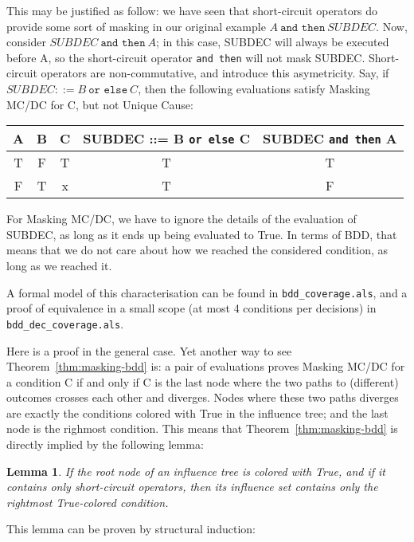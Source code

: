 \documentclass[a4paper,12pt,twoside]{article}
\newcommand{\andthen}{\texttt{and then}}
\newcommand{\orelse}{\texttt{or else}}
\newcommand{\alloyspec}[1]{\texttt{#1}}
\newtheorem{lemma}{Lemma}[subsection]
\begin{document}
This may be justified as follow: we have seen that short-circuit operators
do provide some sort of masking in our original example
$A \ \andthen{} \ SUBDEC$. Now, consider $SUBDEC \ \andthen{} \ A$; in this
case, SUBDEC will always be executed before A, so the short-circuit operator
\andthen{} will not mask SUBDEC. Short-circuit operators are non-commutative,
and introduce this asymetricity. Say, if $SUBDEC ::= B \ \orelse \ C$, then
the following evaluations satisfy Masking MC/DC for C, but not Unique Cause:

\begin{center}
\begin{tabular}{|c|c|c||c||c|}
\hline
A & B & C & SUBDEC ::= B \orelse{} C & SUBDEC \andthen{} A \\ \hline
T & F & T & T                        & T \\ \hline
F & T & x & T                        & F \\ \hline
\end{tabular}
\end{center}

For Masking MC/DC, we have to ignore the details of the evaluation of SUBDEC,
as long as it ends up being evaluated to True. In terms of BDD, that means
that we do not care about how we reached the considered condition, as long
as we reached it.

A formal model of this characterisation can be found in
\alloyspec{bdd\_coverage.als}, and a proof of equivalence in a small scope
(at most 4 conditions per decisions) in \alloyspec{bdd\_dec\_coverage.als}.

Here is a proof in the general case. Yet another way to see
Theorem~\ref{thm:masking-bdd} is: a pair of evaluations proves Masking
MC/DC for a condition C if and only if C is the last node where the
two paths to (different) outcomes crosses each other and
diverges. Nodes where these two paths diverges are exactly the
conditions colored with True in the influence tree; and the last node
is the righmost condition.  This means that
Theorem~\ref{thm:masking-bdd} is directly implied by the following
lemma:

\begin{lemma}
  \label{lemma:short-circuit-influence-set}
  If the root node of an influence tree is colored with True, and
  if it contains only short-circuit operators, then its influence
  set contains only the rightmost True-colored condition.
\end{lemma}

This lemma can be proven by structural induction:
\end{document}

